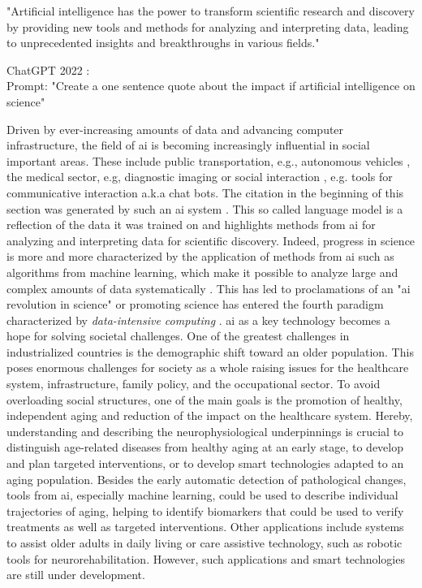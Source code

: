 \epigraph{"Artificial intelligence has the power to transform scientific research and discovery by providing new tools and methods for analyzing and interpreting data, leading to unprecedented insights and breakthroughs in various fields."} {ChatGPT 2022 \cite{Chatgpt_openai_web}:\\
Prompt: "Create a one sentence quote about the impact if artificial intelligence on science"}
 
Driven by ever-increasing amounts of data and advancing computer infrastructure, the field of \gls{ai} is becoming increasingly influential in social important areas. These include public transportation, e.g., autonomous vehicles \cite{Leonard2020}, the medical sector, e.g, diagnostic imaging \cite{Liu2020} or social interaction \cite{Adamopoulou2020}, e.g. tools for communicative interaction a.k.a chat bots. The citation in the beginning  of this section was generated by such an \gls{ai} system \cite{Chatgpt_openai_web}. This so called language model is a reflection of the data it was trained on and highlights methods from \gls{ai} for analyzing and interpreting data for scientific discovery. Indeed, progress in science is more and more characterized by the application of methods from \gls{ai} such as algorithms from machine learning, which make it possible to analyze large and complex amounts of data systematically \cite{Brunton2019}. This has led to proclamations of an "\gls{ai} revolution in science" \cite{Appenzeller2017} or promoting science has entered the fourth paradigm characterized by \textit{data-intensive computing} \cite{Hey2009}. \gls{ai} as a key technology becomes a hope for solving societal challenges. One of the greatest challenges in industrialized countries is the demographic shift toward an older population. This poses enormous challenges for society as a whole raising issues for the healthcare system, infrastructure, family policy, and the occupational sector. To avoid overloading social structures, one of the main goals is the promotion of healthy, independent aging and reduction of the impact on the healthcare system. Hereby, understanding and describing the neurophysiological underpinnings is crucial to distinguish age-related diseases from healthy aging at an early stage, to develop and plan targeted interventions, or to develop smart technologies adapted to an aging population. Besides the early automatic detection of pathological changes, tools from \gls{ai}, especially machine learning, could be used to describe individual trajectories of aging, helping to identify biomarkers that could be used to verify treatments as well as targeted interventions. Other applications include systems to assist older adults in daily living or care assistive technology, such as robotic tools for neurorehabilitation. However, such applications and smart technologies are still under development.\\
